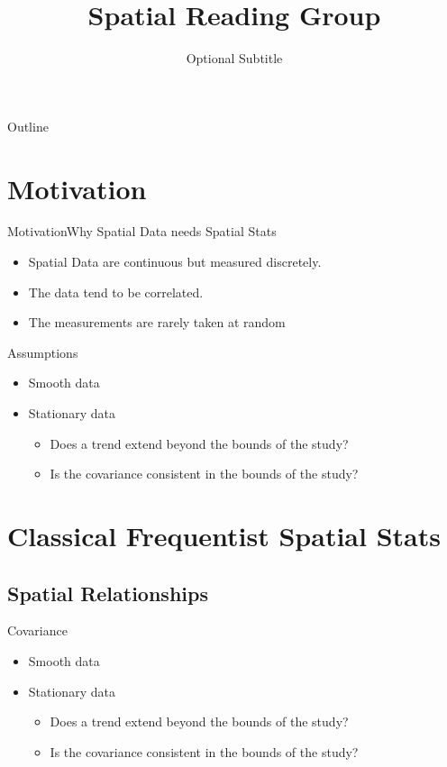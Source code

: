 \documentclass{beamer}
\title{Spatial Reading Group}
\subtitle{Optional Subtitle}
\begin{document}
\begin{frame}
  \titlepage
\end{frame}

\begin{frame}{Outline}
  \tableofcontents
\end{frame}

\section{Motivation}


\begin{frame}{Motivation}{Why Spatial Data needs Spatial Stats}
  \begin{itemize}
  \item {
    Spatial Data are continuous but measured discretely.
  }
  \item {
    The data tend to be correlated.
  }
  \item {
  	The measurements are rarely taken at random
    
  }
  \end{itemize}
\end{frame}

\begin{frame}{Assumptions}{}
  \begin{itemize}
  \item {
    Smooth data
  }
  \item {
    Stationary data
	\begin{itemize}
   		\item Does a trend extend beyond the bounds of the study?
   		\item Is the covariance consistent in the bounds of the study?
    \end{itemize}
  }
  \end{itemize}
\end{frame}

\section{Classical Frequentist Spatial Stats}
\subsection{Spatial Relationships}
\begin{frame}{Covariance}{}
  \begin{itemize}
  \item {
    Smooth data
  }
  \item {
    Stationary data
	\begin{itemize}
   		\item Does a trend extend beyond the bounds of the study?
   		\item Is the covariance consistent in the bounds of the study?
    \end{itemize}
  }
  \end{itemize}
\end{frame}
\end{document}
